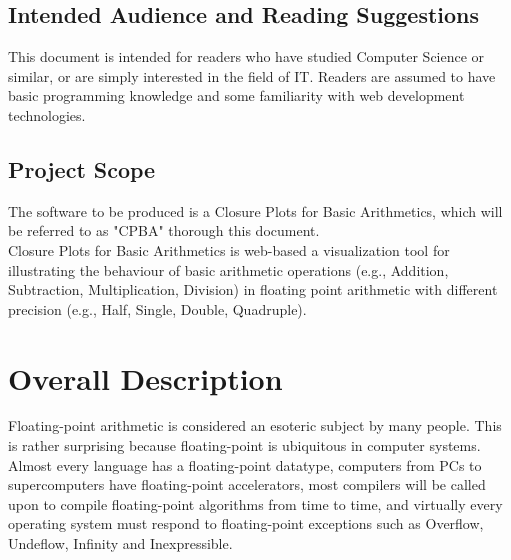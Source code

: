 \documentclass[11pt]{article}
\begin{document}
\subsection{Intended Audience and Reading Suggestions}
This document is intended for readers who have studied Computer Science or similar, or are simply interested in the field of IT. Readers are assumed to have basic programming knowledge and some familiarity with web development technologies.

\subsection{Project Scope}
The software to be produced is a Closure Plots for Basic Arithmetics, which will be referred to as "CPBA" thorough this document.\\

Closure Plots for Basic Arithmetics is web-based a visualization tool for illustrating the behaviour of basic arithmetic operations (e.g., Addition, Subtraction, Multiplication, Division) in floating point arithmetic with different precision (e.g., Half, Single, Double, Quadruple).






\section{Overall Description}%
Floating-point arithmetic is considered an esoteric subject by many people. This is rather surprising because floating-point is ubiquitous in computer systems. Almost every language has a floating-point datatype, computers from PCs to supercomputers have floating-point accelerators, most compilers will be called upon to compile floating-point algorithms from time to time, and virtually every operating system must respond to floating-point exceptions such as Overflow, Undeflow, Infinity and Inexpressible.\\
\end{document}
